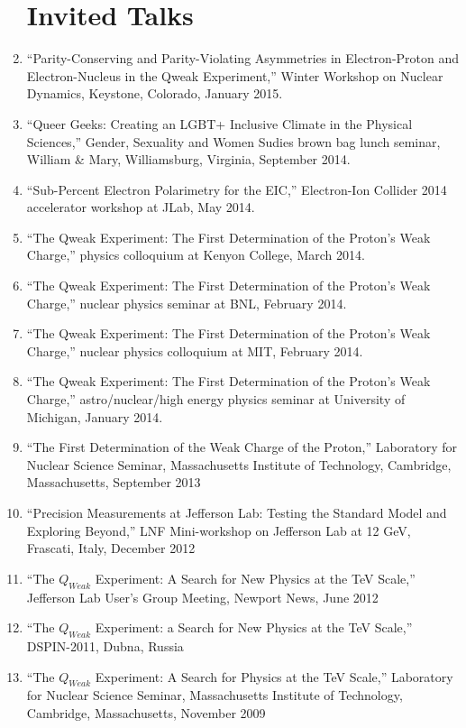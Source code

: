 \documentclass[overlapped,line,final,11pt,letterpaper]{res}
\begin{document}
\begin{resume}
\begin{enumerate}
\section{\bf\small\quad Invited Talks}
\item ``Parity-Conserving and Parity-Violating Asymmetries in Electron-Proton and Electron-Nucleus in the Qweak Experiment,'' Winter Workshop on Nuclear Dynamics, Keystone, Colorado, January 2015.
\item ``Queer Geeks: Creating an LGBT+ Inclusive Climate in the Physical Sciences,'' Gender, Sexuality and Women Sudies brown bag lunch seminar, William \& Mary, Williamsburg, Virginia, September 2014.
\item ``Sub-Percent Electron Polarimetry for the EIC,'' Electron-Ion Collider 2014 accelerator workshop at JLab, May 2014.
\item ``The Qweak Experiment: The First Determination of the Proton’s Weak Charge,'' physics colloquium at Kenyon College, March 2014.
\item ``The Qweak Experiment: The First Determination of the Proton’s Weak Charge,'' nuclear physics seminar at BNL, February 2014.
\item ``The Qweak Experiment: The First Determination of the Proton’s Weak Charge,'' nuclear physics colloquium at MIT, February 2014.
\item ``The Qweak Experiment: The First Determination of the Proton’s Weak Charge,'' astro/nuclear/high energy physics seminar at University of Michigan, January 2014.
\item ``The First Determination of the Weak Charge of the Proton,'' Laboratory for Nuclear Science Seminar, Massachusetts Institute of Technology, Cambridge, Massachusetts, September 2013
\item ``Precision Measurements at Jefferson Lab: Testing the Standard Model and Exploring Beyond,'' LNF Mini-workshop on Jefferson Lab at 12 GeV, Frascati, Italy, December 2012
\item ``The $Q_{Weak}$ Experiment: A Search for New Physics at the TeV Scale,'' Jefferson Lab User's Group Meeting, Newport News, June 2012
\item ``The $Q_{Weak}$ Experiment: a Search for New Physics at the TeV Scale,'' DSPIN-2011, Dubna, Russia
\item ``The $Q_{Weak}$ Experiment: A Search for Physics at the TeV Scale,'' Laboratory for Nuclear Science Seminar, Massachusetts Institute of Technology, Cambridge, Massachusetts, November 2009

\end{enumerate}
\end{resume}
\end{document}
